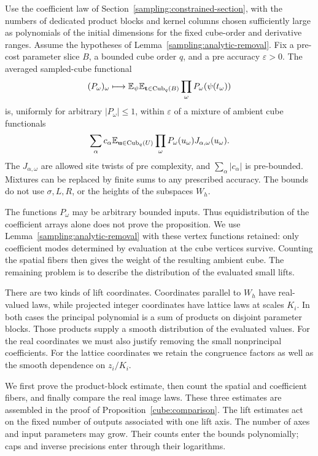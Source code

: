 \begin{proposition}
\label{cube:comparison}
Use the coefficient law of Section~\ref{sampling:constrained-section}, with
the numbers of dedicated product blocks and kernel columns chosen
sufficiently large as polynomials of the initial dimensions for
the fixed cube-order and derivative ranges. Assume the hypotheses
of Lemma~\ref{sampling:analytic-removal}.
Fix a pre-cost parameter slice $B$, a bounded cube order $q$, and a pre
accuracy $\varepsilon>0$. The averaged sampled-cube functional
\[
 (P_\omega)_\omega\longmapsto
 \mathbb E_\psi\mathbb E_{\mathbf t\in\operatorname{Cub}_q(B)}
                  \prod_\omega P_\omega(\psi(t_\omega))
\]
is, uniformly for arbitrary $|P_\omega|\le1$, within
$\varepsilon$ of a mixture of ambient cube functionals
\[
 \sum_\alpha c_\alpha
 \mathbb E_{\mathbf u\in\operatorname{Cub}_q(U)}
       \prod_\omega P_\omega(u_\omega)J_{\alpha,\omega}(u_\omega).
\]
The $J_{\alpha,\omega}$ are allowed site twists of pre complexity,
and $\sum_\alpha|c_\alpha|$ is pre-bounded. Mixtures can be
replaced by finite sums to any prescribed accuracy. The bounds do
not use $\sigma,L,R$, or the heights of the subspaces $W_h$.
\end{proposition}

The functions $P_\omega$ may be arbitrary bounded inputs. Thus
equidistribution of the coefficient arrays alone does not prove
the proposition. We use Lemma~\ref{sampling:analytic-removal}
with these vertex functions retained: only coefficient modes
determined by evaluation at the cube vertices survive. Counting
the spatial fibers then gives the weight of the resulting ambient
cube. The remaining problem is to describe the distribution of
the evaluated small lifts.

There are two kinds of lift coordinates. Coordinates parallel to
$W_h$ have real-valued laws, while projected integer coordinates
have lattice laws at scales $K_i$. In both cases the principal
polynomial is a sum of products on disjoint parameter blocks.
Those products supply a smooth distribution of the evaluated
values. For the real coordinates we must also justify removing
the small nonprincipal coefficients. For the lattice coordinates
we retain the congruence factors as well as the smooth dependence
on $z_i/K_i$.

We first prove the product-block estimate, then count the spatial
and coefficient fibers, and finally compare the real image laws.
These three estimates are assembled in the proof of
Proposition~\ref{cube:comparison}. The lift estimates act on the
fixed number of outputs associated with one lift axis. The number
of axes and input parameters may grow. Their counts enter the
bounds polynomially; caps and inverse precisions enter through
their logarithms.

